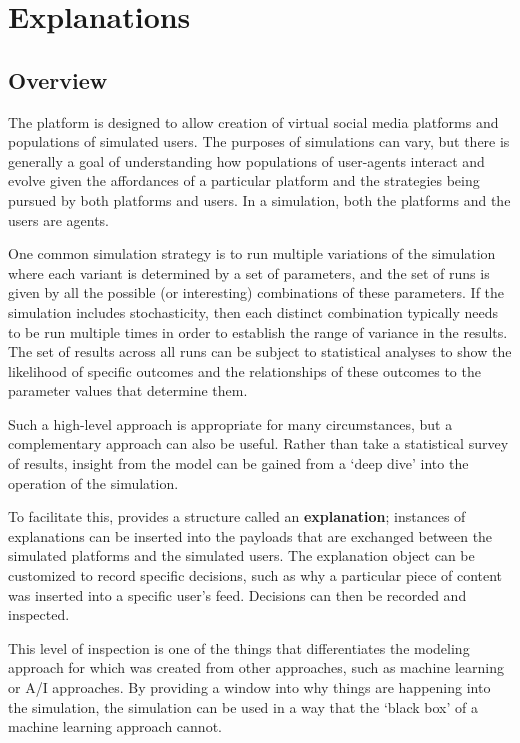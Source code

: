 
\chapter{Explanations} \label{chap:Explanations}

 \section{Overview}
The \rhpc platform is designed to allow creation of virtual social media platforms and populations of simulated users. 
The purposes of simulations can vary, but there is generally a goal of understanding how populations of user-agents interact and evolve given the affordances of a particular platform and the strategies being pursued by both platforms and users.
 In a simulation, both the platforms and the users are agents.
 
One common simulation strategy is to run multiple variations of the simulation where each variant is determined by a set of parameters, and the set of runs is given by all the possible (or interesting) combinations of these parameters. If the simulation includes stochasticity, then each distinct combination typically needs to be run multiple times in order to establish the range of variance in the results. The set of results across all runs can be subject to statistical analyses to show the likelihood of specific outcomes and the relationships of these outcomes to the parameter values that determine them.

Such a high-level approach is appropriate for many circumstances, but a complementary approach can also be useful. Rather than take a statistical survey of results, insight from the model can be gained from a `deep dive' into the operation of the simulation.

To facilitate this, \rhpc provides a structure called an \textbf{explanation}; instances of explanations can be inserted into the payloads that are exchanged between the simulated platforms and the simulated users. The explanation object can be customized to record specific decisions, such as why a particular piece of content was inserted into a specific user's feed. Decisions can then be recorded and inspected.

This level of inspection is one of the things that differentiates the modeling approach for which \rhpc was created from other approaches, such as machine learning or A/I approaches. By providing a window into why things are happening into the simulation, the simulation can be used in a way that the `black box' of a machine learning approach cannot.

